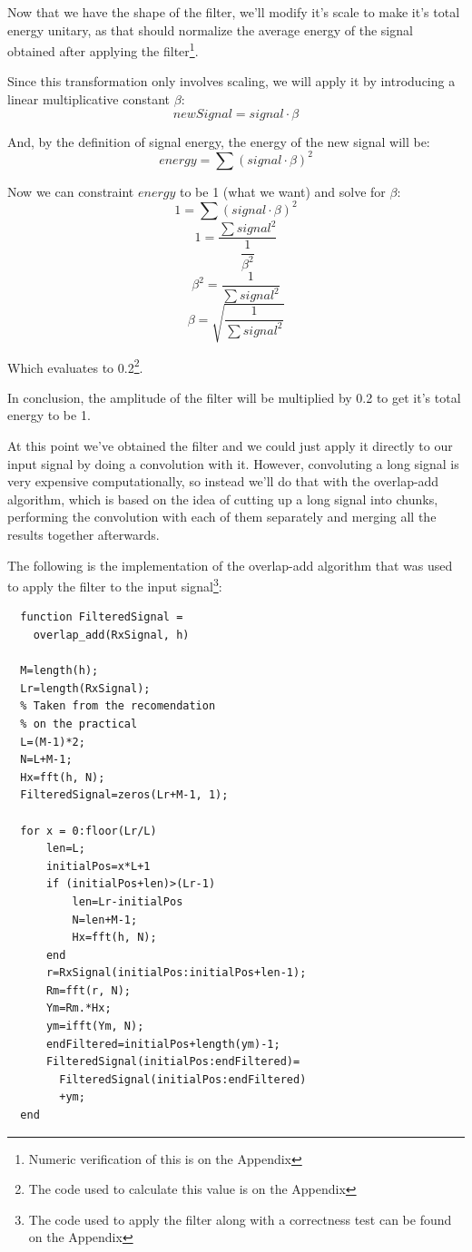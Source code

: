 \documentclass[conference,9pt]{IEEEtran}
\begin{document}
Now that we have the shape of the filter, we'll modify it's scale to make it's total energy unitary, as that should normalize the average energy of the signal obtained after applying the filter\footnote{Numeric verification of this is on the Appendix}.

Since this transformation only involves scaling, we will apply it by introducing a linear multiplicative constant $\beta$:
$$newSignal = signal\cdot \beta$$

And, by the definition of signal energy\cite{energy}, the energy of the new signal will be:
$$energy = \sum (signal\cdot \beta)^2$$

Now we can constraint $energy$ to be 1 (what we want) and solve for $\beta$:
$$1 = \sum (signal\cdot \beta)^2$$
$$1 = \dfrac{\sum signal^2}{\dfrac{1}{\beta^2}}$$
$$\beta^2 = \dfrac{1}{\sum signal^2}$$
$$\beta = \sqrt{\dfrac{1}{\sum signal^2}}$$

Which evaluates to 0.2\footnote{The code used to calculate this value is on the Appendix}.

In conclusion, the amplitude of the filter will be multiplied by 0.2 to get it's total energy to be 1.

At this point we've obtained the filter and we could just apply it directly to our input signal by doing a convolution with it. However, convoluting a long signal is very expensive computationally, so instead we'll do that with the overlap-add algorithm\cite{overlap}, which is based on the idea of cutting up a long signal into chunks, performing the convolution with each of them separately and merging all the results together afterwards.

\pagebreak
The following is the implementation of the overlap-add algorithm that was used to apply the filter to the input signal\footnote{The code used to apply the filter along with a correctness test can be found on the Appendix}:
\begin{verbatim}
  function FilteredSignal = 
    overlap_add(RxSignal, h)

  M=length(h);
  Lr=length(RxSignal);
  % Taken from the recomendation
  % on the practical
  L=(M-1)*2;
  N=L+M-1;
  Hx=fft(h, N);
  FilteredSignal=zeros(Lr+M-1, 1);
  
  for x = 0:floor(Lr/L)
      len=L;
      initialPos=x*L+1
      if (initialPos+len)>(Lr-1)
          len=Lr-initialPos
          N=len+M-1;
          Hx=fft(h, N);
      end
      r=RxSignal(initialPos:initialPos+len-1);
      Rm=fft(r, N);
      Ym=Rm.*Hx;
      ym=ifft(Ym, N);
      endFiltered=initialPos+length(ym)-1;
      FilteredSignal(initialPos:endFiltered)=
        FilteredSignal(initialPos:endFiltered)
        +ym;
  end
\end{verbatim}
  
\end{document}
